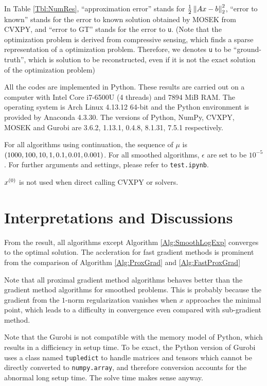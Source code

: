 \documentclass[english]{pkupaper}
\begin{document}
In Table \ref{Tbl:NumRes}, ``approximation error'' stands for $ \frac{1}{2} \left\|  A x - b  \right\|_2^2 $, ``error to known'' stands for the error to known solution obtained by MOSEK from CVXPY, and ``error to GT'' stands for the error to \verb"u". (Note that the optimization problem is derived from compressive sensing, which finds a sparse representation of a optimization problem. Therefore, we denotes \verb"u" to be ``ground-truth'', which is solution to be reconstructed, even if it is not the exact solution of the optimization problem)

All the codes are implemented in Python. These results are carried out on a computer with Intel Core i7-6500U (4 threads) and 7894 MiB RAM. The operating system is Arch Linux 4.13.12 64-bit and the Python environment is provided by Anaconda 4.3.30. The versions of Python, NumPy, CVXPY, MOSEK and Gurobi are 3.6.2, 1.13.1, 0.4.8, 8.1.31, 7.5.1 respectively.

For all algorithms using continuation, the sequence of $\mu$ is $ \left(  1000, 100, 10, 1, 0.1, 0.01, 0.001  \right) $. For all smoothed algorithms, $\epsilon$ are set to be $10^{-5}$. For further arguments and settings, please refer to \verb"test.ipynb".

$x^{\left( 0 \right)}$ is not used when direct calling CVXPY or solvers.

\section{Interpretations and Discussions}

From the result, all algorithms except Algorithm \ref{Alg:SmoothLogExp} converges to the optimal solution. The accleration for fast gradient methods is prominent from the comparison of Algorithm \ref{Alg:ProxGrad} and \ref{Alg:FastProxGrad}

Note that all proximal gradient method algorithms behaves better than the gradient method algorithms for smoothed problems. This is probably because the gradient from the $1$-norm regularization vanishes when $x$ approaches the minimal point, which leads to a difficulty in convergence even compared with sub-gradient method.

Note that the Gurobi is not compatible with the memory model of Python, which results in a difficiency in setup time. To be exact, the Python version of Gurobi uses a class named \verb"tupledict" to handle matrices and tensors which cannot be directly converted to \verb"numpy.array", and therefore conversion accounts for the abnormal long setup time. The solve time makes sense anyway.

	
\end{document}
